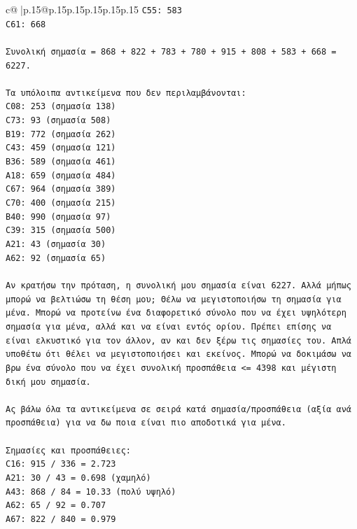 \documentclass{article}
\begin{document}
{\begin{supertabular}{c@{$\;$}|p{.15\linewidth}@{}p{.15\linewidth}p{.15\linewidth}p{.15\linewidth}p{.15\linewidth}p{.15\linewidth}}
{{{\texttt{C55: 583} \\
\texttt{C61: 668} \\
\\ 
\texttt{Συνολική σημασία = 868 + 822 + 783 + 780 + 915 + 808 + 583 + 668 = 6227.} \\
\\ 
\texttt{Τα υπόλοιπα αντικείμενα που δεν περιλαμβάνονται:} \\
\texttt{C08: 253 (σημασία 138)} \\
\texttt{C73: 93 (σημασία 508)} \\
\texttt{B19: 772 (σημασία 262)} \\
\texttt{C43: 459 (σημασία 121)} \\
\texttt{B36: 589 (σημασία 461)} \\
\texttt{A18: 659 (σημασία 484)} \\
\texttt{C67: 964 (σημασία 389)} \\
\texttt{C70: 400 (σημασία 215)} \\
\texttt{B40: 990 (σημασία 97)} \\
\texttt{C39: 315 (σημασία 500)} \\
\texttt{A21: 43 (σημασία 30)} \\
\texttt{A62: 92 (σημασία 65)} \\
\\ 
\texttt{Αν κρατήσω την πρόταση, η συνολική μου σημασία είναι 6227. Αλλά μήπως μπορώ να βελτιώσω τη θέση μου; Θέλω να μεγιστοποιήσω τη σημασία για μένα. Μπορώ να προτείνω ένα διαφορετικό σύνολο που να έχει υψηλότερη σημασία για μένα, αλλά και να είναι εντός ορίου. Πρέπει επίσης να είναι ελκυστικό για τον άλλον, αν και δεν ξέρω τις σημασίες του. Απλά υποθέτω ότι θέλει να μεγιστοποιήσει και εκείνος. Μπορώ να δοκιμάσω να βρω ένα σύνολο που να έχει συνολική προσπάθεια <= 4398 και μέγιστη δική μου σημασία.} \\
\\ 
\texttt{Ας βάλω όλα τα αντικείμενα σε σειρά κατά σημασία/προσπάθεια (αξία ανά προσπάθεια) για να δω ποια είναι πιο αποδοτικά για μένα.} \\
\\ 
\texttt{Σημασίες και προσπάθειες:} \\
\texttt{C16: 915 / 336 = 2.723} \\
\texttt{A21: 30 / 43 = 0.698 (χαμηλό)} \\
\texttt{A43: 868 / 84 = 10.33 (πολύ υψηλό)} \\
\texttt{A62: 65 / 92 = 0.707} \\
\texttt{A67: 822 / 840 = 0.979} \\
}}}
\end{supertabular}}
\end{document}
